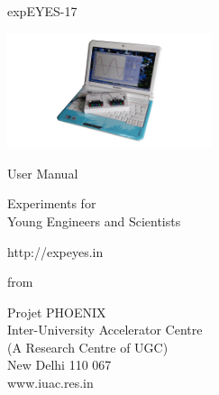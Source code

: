 \documentclass[12pt,a4paper]{report}
\begin{document}
\begin{titlepage}
\thispagestyle{empty}

\vspace{0.2in}

\begin{center}
{\Huge{}expEYES-17}
\par\end{center}{\Huge \par}

\begin{center}
\includegraphics[width=6cm]{../../pics/eyes17-nb}
\par\end{center}

\begin{center}
{\large{}User Manual }
\par\end{center}{\large \par}

\begin{center}
{\LARGE{} Experiments for}\\
{\LARGE{} Young Engineers and Scientists}
\par\end{center}{\LARGE \par}

\begin{center}
http://expeyes.in
\par\end{center}

\begin{center}
from
\par\end{center}

\begin{center}
Projet PHOENIX\\
Inter-University Accelerator Centre \\
(A Research Centre of UGC)\\
New Delhi 110 067\\
www.iuac.res.in
\par\end{center}

\end{titlepage}
\end{document}
